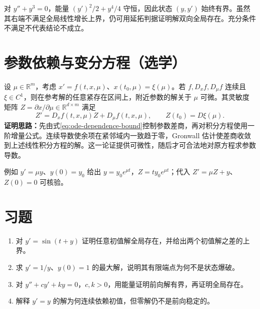 \begin{example}
对 $y''+y^3=0$，能量 $(y')^2/2+y^4/4$ 守恒，因此状态 $(y,y')$ 始终有界。虽然其右端不满足全局线性增长上界，仍可用延拓判据证明解双向全局存在。充分条件不满足不代表结论不成立。
\end{example}

\section{参数依赖与变分方程（选学）}
设 $\mu\in\mathbb R^m$，考虑 $x'=f(t,x,\mu)$、$x(t_0,\mu)=\xi(\mu)$。若 $f,D_xf,D_\mu f$ 连续且 $\xi\in C^1$，则在参考解的任意紧存在区间上，附近参数的解关于 $\mu$ 可微。其灵敏度矩阵 $Z=\partial x/\partial\mu\in\mathbb R^{d\times m}$ 满足
\begin{equation}
 Z'=D_xf(t,x,\mu)Z+D_\mu f(t,x,\mu),\qquad Z(t_0)=D\xi(\mu).
 \label{eq:ode-sensitivity}
\end{equation}
\textbf{证明思路：}先由式\eqref{eq:ode-dependence-bound}控制参数差商，再对积分方程使用一阶增量公式。连续导数使余项在紧邻域内一致趋于零，Gronwall 估计使差商收敛到上述线性积分方程的解。这一论证提供可微性，随后才可合法地对原方程求参数导数。

例如 $y'=\mu y$、$y(0)=y_0$ 给出 $y=y_0e^{\mu t}$，$Z=ty_0e^{\mu t}$；代入 $Z'=\mu Z+y$、$Z(0)=0$ 可核验。

\section{习题}
\begin{enumerate}
 \item\label{ex:ode-growth} 对 $y'=\sin(t+y)$ 证明任意初值解全局存在，并给出两个初值解之差的上界。
 \item\label{ex:ode-domain} 求 $y'=1/y$、$y(0)=1$ 的最大解，说明其有限端点为何不是状态爆破。
 \item 对 $y''+cy'+ky=0$，$c,k>0$，用能量证明前向解有界，再证明全局存在。
 \item 解释 $y'=y$ 的解为何连续依赖初值，但零解仍不是前向稳定的。
\end{enumerate}

